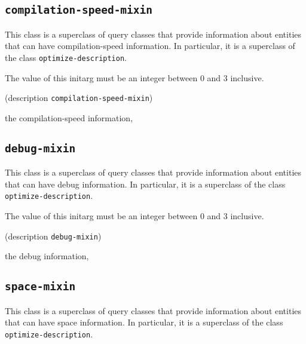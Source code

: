 \subsection{\texttt{compilation-speed-mixin}}
\label{sec-compilation-speed-mixin}

{\footnotesize
{}
}

This class is a superclass of query classes that provide information
about entities that can have compilation-speed information.  In particular, it is a
superclass of the class \texttt{optimize-description}.

{\footnotesize
{}
}

The value of this initarg must be an integer between $0$ and $3$
inclusive.

{\footnotesize
{} {(description {\tt compilation-speed-mixin})}
}

 the compilation-speed information, 

\subsection{\texttt{debug-mixin}}
\label{sec-debug-mixin}

{\footnotesize
{}
}
This class is a superclass of query classes that provide information
about entities that can have debug information.  In particular, it is a
superclass of the class \texttt{optimize-description}.

{\footnotesize
{}
}

The value of this initarg must be an integer between $0$ and $3$
inclusive.

{\footnotesize
{} {(description {\tt debug-mixin})}
}

 the debug information, 

\subsection{\texttt{space-mixin}}
\label{sec-space-mixin}

{\footnotesize
{}
}

This class is a superclass of query classes that provide information
about entities that can have space information.  In particular, it is a
superclass of the class \texttt{optimize-description}.

